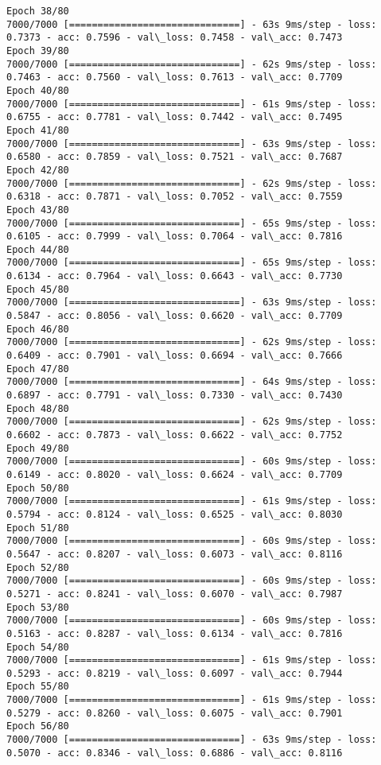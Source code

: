 \documentclass[11pt]{article}
\begin{document}
\begin{Verbatim}[commandchars=\\\{\}]
Epoch 38/80
7000/7000 [==============================] - 63s 9ms/step - loss: 0.7373 - acc: 0.7596 - val\_loss: 0.7458 - val\_acc: 0.7473
Epoch 39/80
7000/7000 [==============================] - 62s 9ms/step - loss: 0.7463 - acc: 0.7560 - val\_loss: 0.7613 - val\_acc: 0.7709
Epoch 40/80
7000/7000 [==============================] - 61s 9ms/step - loss: 0.6755 - acc: 0.7781 - val\_loss: 0.7442 - val\_acc: 0.7495
Epoch 41/80
7000/7000 [==============================] - 63s 9ms/step - loss: 0.6580 - acc: 0.7859 - val\_loss: 0.7521 - val\_acc: 0.7687
Epoch 42/80
7000/7000 [==============================] - 62s 9ms/step - loss: 0.6318 - acc: 0.7871 - val\_loss: 0.7052 - val\_acc: 0.7559
Epoch 43/80
7000/7000 [==============================] - 65s 9ms/step - loss: 0.6105 - acc: 0.7999 - val\_loss: 0.7064 - val\_acc: 0.7816
Epoch 44/80
7000/7000 [==============================] - 65s 9ms/step - loss: 0.6134 - acc: 0.7964 - val\_loss: 0.6643 - val\_acc: 0.7730
Epoch 45/80
7000/7000 [==============================] - 63s 9ms/step - loss: 0.5847 - acc: 0.8056 - val\_loss: 0.6620 - val\_acc: 0.7709
Epoch 46/80
7000/7000 [==============================] - 62s 9ms/step - loss: 0.6409 - acc: 0.7901 - val\_loss: 0.6694 - val\_acc: 0.7666
Epoch 47/80
7000/7000 [==============================] - 64s 9ms/step - loss: 0.6897 - acc: 0.7791 - val\_loss: 0.7330 - val\_acc: 0.7430
Epoch 48/80
7000/7000 [==============================] - 62s 9ms/step - loss: 0.6602 - acc: 0.7873 - val\_loss: 0.6622 - val\_acc: 0.7752
Epoch 49/80
7000/7000 [==============================] - 60s 9ms/step - loss: 0.6149 - acc: 0.8020 - val\_loss: 0.6624 - val\_acc: 0.7709
Epoch 50/80
7000/7000 [==============================] - 61s 9ms/step - loss: 0.5794 - acc: 0.8124 - val\_loss: 0.6525 - val\_acc: 0.8030
Epoch 51/80
7000/7000 [==============================] - 60s 9ms/step - loss: 0.5647 - acc: 0.8207 - val\_loss: 0.6073 - val\_acc: 0.8116
Epoch 52/80
7000/7000 [==============================] - 60s 9ms/step - loss: 0.5271 - acc: 0.8241 - val\_loss: 0.6070 - val\_acc: 0.7987
Epoch 53/80
7000/7000 [==============================] - 60s 9ms/step - loss: 0.5163 - acc: 0.8287 - val\_loss: 0.6134 - val\_acc: 0.7816
Epoch 54/80
7000/7000 [==============================] - 61s 9ms/step - loss: 0.5293 - acc: 0.8219 - val\_loss: 0.6097 - val\_acc: 0.7944
Epoch 55/80
7000/7000 [==============================] - 61s 9ms/step - loss: 0.5279 - acc: 0.8260 - val\_loss: 0.6075 - val\_acc: 0.7901
Epoch 56/80
7000/7000 [==============================] - 63s 9ms/step - loss: 0.5070 - acc: 0.8346 - val\_loss: 0.6886 - val\_acc: 0.8116

\end{Verbatim}
\end{document}

